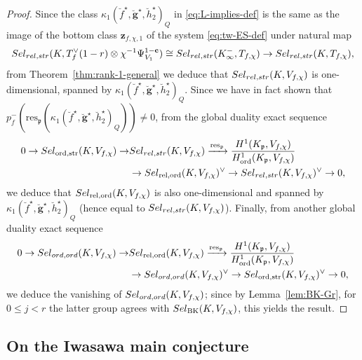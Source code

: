 \documentclass[10pt,letterpaper]{amsart}
\theoremstyle{plain}
\theoremstyle{definition}
\theoremstyle{definition}
\theoremstyle{plain}
\theoremstyle{plain}
\theoremstyle{plain}
\theoremstyle{remark}
\numberwithin{equation}{section}
\newcommand{\cc}{\mathbf{c}}
\newcommand{\Sel}{Sel}
\newcommand{\pp}{\mathfrak{p}}
\newcommand{\relstr}{{{\rm rel},{\rm str}}}
\newcommand{\ord}{{{\rm ord},{\rm ord}}}
\def\Sel{{\rm Sel}}
\def\Ord{{\mathrm{ord}}}
\newcommand{\bfg}{{\boldsymbol{g}}}
\begin{document}
\begin{proof}
Since the class $\kappa_1(\breve{f}^\star,\breve{\bfg}^\star,\breve{h}_2^\star)_Q$ in \eqref{eq:L-implies-def} is the same as the image of the bottom class $\mathbf{z}_{f,\chi,1}$ of the system \eqref{eq:tw-ES-def} under natural map
\[
\Sel_{\relstr}(K,T_f^{\vee}(1-r)\otimes\chi^{-1}\Psi_{V_1}^{1-\cc})\cong\Sel_{\relstr}(K_\infty^-,T_{f,\chi})\rightarrow\Sel_{\relstr}(K,T_{f,\chi}),
\]
from Theorem~\ref{thm:rank-1-general} 
we deduce that $\Sel_{\relstr}(K,V_{f,\chi})$ is one-dimensional, spanned by $\kappa_1(\breve{f}^\star,\breve{\bfg}^\star,\breve{h}_2^\star)_Q$. 
Since we have in fact shown that $p_f^-({\mathrm{res}}_\pp(\kappa_1(\breve{f}^\star,\breve{\bfg}^\star,\breve{h}_2^\star)_Q))\neq 0$, from the global duality exact sequence
\begin{align*}
0\rightarrow\Sel_{\Ord,{\mathrm{str}}}(K,V_{f,\chi})
\rightarrow&\Sel_{\relstr}(K,V_{f,\chi})
\xrightarrow{{\mathrm{res}}_\pp}\frac{H^1(K_\pp,V_{f,\chi})}{H^1_{\Ord}(K_\pp,V_{f,\chi})}\\
&\rightarrow\Sel_{{\mathrm{rel}},\Ord}(K,V_{f,\chi})^\vee\rightarrow\Sel_{\relstr}(K,V_{f,\chi})^\vee\rightarrow 0,
\end{align*}
we deduce that $\Sel_{{\mathrm{rel}},\Ord}(K,V_{f,\chi})$ is also one-dimensional and spanned by $\kappa_1(\breve{f}^\star,\breve{\bfg}^\star,\breve{h}_2^\star)_Q$ (hence equal to $\Sel_{\relstr}(K,V_{f,\chi})$). Finally, from another global duality exact sequence 
\begin{align*}
0\rightarrow\Sel_{\ord}(K,V_{f,\chi})
\rightarrow &\Sel_{\mathrm{rel,ord}}(K,V_{f,\chi})
\xrightarrow{{\mathrm{res}}_\pp}\frac{H^1(K_\pp,V_{f,\chi})}{H^1_{\Ord}(K_\pp,V_{f,\chi})}\\
&\rightarrow\Sel_{\ord}(K,V_{f,\chi})^\vee\rightarrow\Sel_{\mathrm{ord,str}}(K,V_{f,\chi})^\vee\rightarrow 0,
\end{align*}
we deduce the vanishing of $\Sel_{\ord}(K,V_{f,\chi})$; 
since by Lemma~\ref{lem:BK-Gr}, for $0\leq j<r$ the latter group agrees with $\Sel_{\mathrm{BK}}(K,V_{f,\chi})$, this yields the result.
\end{proof}


\subsection{On the Iwasawa main conjecture}
\label{subsec:IMC-def}
\end{document}
